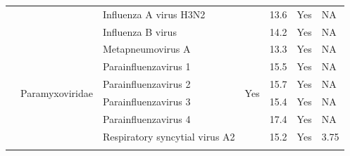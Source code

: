 \begin{center}
\begin{landscape}
\begin{table}[]
{\begin{tabular}{|l|l|l|l|l|l|l|}
                           &                                   & Influenza A virus H3N2         &                      & 13.6        & Yes                  & NA                                           \\ \cline{3-3} \cline{5-7} 
                           &                                   & Influenza B virus              &                      & 14.2        & Yes                  & NA                                           \\ \cline{2-7} 
                           & \multirow{6}{*}{Paramyxoviridae}  & Metapneumovirus A              & \multirow{6}{*}{Yes} & 13.3        & Yes                  & NA                                           \\ \cline{3-3} \cline{5-7} 
                           &                                   & Parainfluenzavirus 1           &                      & 15.5        & Yes                  & NA                                           \\ \cline{3-3} \cline{5-7} 
                           &                                   & Parainfluenzavirus 2           &                      & 15.7        & Yes                  & NA                                           \\ \cline{3-3} \cline{5-7} 
                           &                                   & Parainfluenzavirus 3           &                      & 15.4        & Yes                  & NA                                           \\ \cline{3-3} \cline{5-7} 
                           &                                   & Parainfluenzavirus 4           &                      & 17.4        & Yes                  & NA                                           \\ \cline{3-3} \cline{5-7} 
                           &                                   & Respiratory syncytial virus A2 &                      & 15.2        & Yes                  & 3.75                                         \\ \hline
\small
\end{tabular}
}
\end{table}


\end{landscape}

\clearpage

\end{center}

